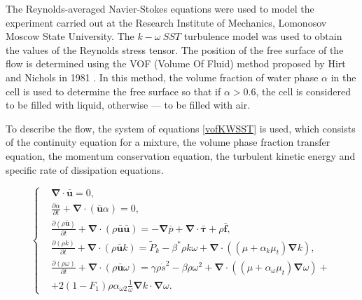 \documentclass[sensors,article,submit,moreauthors,pdftex]{Definitions/mdpi}
\begin{document}
The Reynolds-averaged Navier-Stokes equations were used to model the experiment carried out at the Research Institute of Mechanics, Lomonosov Moscow State University. The $k-\omega\ SST$ turbulence model was used to obtain the values of the Reynolds stress tensor. The position of the free surface of the flow is determined using the VOF (Volume Of Fluid) method proposed by Hirt and Nichols in 1981 \cite{HirtNichols1981}. In this method, the volume fraction of water phase $\alpha$ in the cell is used to determine the free surface so that if $\alpha>0.6$, the cell is considered to be filled with liquid, otherwise --- to be filled with air.


To describe the flow, the system of equations \eqref{vofKWSST} is used, which consists of the continuity equation for a mixture, the volume phase fraction transfer equation, the momentum conservation equation, the turbulent kinetic energy and specific rate of dissipation equations.

\begin{equation}
	\label{vofKWSST}
	\left\{
		\begin{aligned}
			&\boldsymbol{\nabla} \cdot \bar{\boldsymbol{u}} = 0,\\
			&\frac{\partial \alpha}{\partial t} + \boldsymbol{\nabla} \cdot (\bar{\boldsymbol{u}} \alpha) = 0,\\
			&\frac{\partial (\rho \bar{\boldsymbol{u}})}{\partial t} + \boldsymbol{\nabla} \cdot (\rho \bar{\boldsymbol{u}} \bar{\boldsymbol{u}}) = -\boldsymbol{\nabla} \bar{p} + \boldsymbol{\nabla} \cdot \bar{\boldsymbol{\tau}} + \rho \bar{\boldsymbol{f}},\\
			&\frac{\partial (\rho k)}{\partial t} + \boldsymbol{\nabla} \cdot (\rho \bar{\boldsymbol{u}} k) = \widetilde{P}_k - \beta^*\rho k \omega + \boldsymbol{\nabla} \cdot \left( (\mu + \alpha_k \mu_t) \boldsymbol{\nabla} k \right),\\
			&\frac{\partial (\rho \omega)}{\partial t}  + \boldsymbol{\nabla} \cdot ( \rho \bar{\boldsymbol{u}} \omega) = \gamma \rho \dot{s}^2 - \beta \rho \omega^2 + \boldsymbol{\nabla} \cdot \left( (\mu + \alpha_\omega \mu_t) \boldsymbol{\nabla} \omega \right) + \\
			&+2 (1 - F_1) \rho \alpha_{\omega 2} \frac{1}{\omega} \boldsymbol{\nabla} k \cdot \boldsymbol{\nabla} \omega.
		\end{aligned}
	\right.
\end{equation} 
\end{document}
